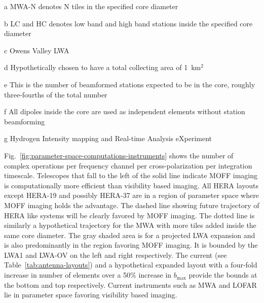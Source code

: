 \documentclass[a4paper,fleqn,usenatbib]{mnras}
\begin{document}
\begin{table}
\begin{threeparttable}
  \begin{tablenotes}
    \item[a] MWA-N denotes N tiles in the specified core diameter
    \item[b] LC and HC denotes low band and high band stations inside the 
      specified core diameter 
    \item[c] Owens Valley LWA
    \item[d] Hypothetically chosen to have a total collecting area of 
      1~km$^2$
    \item[e] This is the number of beamformed stations expected to be in the 
      core, roughly three-fourths of the total number
    \item[f] All dipoles inside the core are used as independent elements 
      without station beamforming
    \item[g] Hydrogen Intensity mapping and Real-time Analysis eXperiment
  \end{tablenotes}
  \end{threeparttable}
\end{table}

Fig.~\ref{fig:parameter-space-computations-instruments} shows the number of 
complex operations per frequency channel per cross-polarization per integration 
timescale. Telescopes that fall to the left of the solid line indicate MOFF 
imaging is computationally more efficient than visibility based imaging. All HERA 
layouts except HERA-19 and possibly HERA-37 are in a region of parameter space 
where MOFF imaging holds the advantage. The dashed line showing future trajectory 
of HERA like systems will be clearly favored by MOFF imaging. The dotted line is 
similarly a hypothetical trajectory for the MWA with more tiles added inside the 
same core diameter. The gray shaded area is for a projected LWA expansion and is 
also predominantly in the region favoring MOFF imaging. It is bounded by the LWA1 
and LWA-OV on the left and right respectively. The current (see 
Table~\ref{tab:antenna-layouts}) and a hypothetical expanded layout with a 
four-fold increase in number of elements over a 50\% increase in $b_\textrm{max}$ 
provide the bounds at the bottom and top respectively. Current instruments such 
as MWA and LOFAR lie in parameter space favoring visibility based imaging. 
\end{document}
